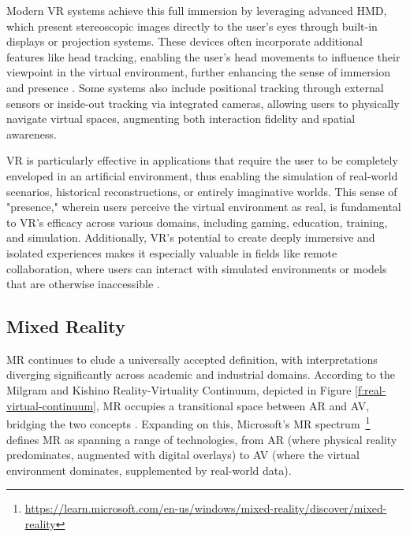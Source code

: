     Modern \ac{VR} systems achieve this full immersion by leveraging advanced \ac{HMD}, which present stereoscopic images directly to the user’s eyes through built-in displays or projection systems. These devices often incorporate additional features like head tracking, enabling the user’s head movements to influence their viewpoint in the virtual environment, further enhancing the sense of immersion and presence \cite{whatismixedreality}. Some systems also include positional tracking through external sensors or inside-out tracking via integrated cameras, allowing users to physically navigate virtual spaces, augmenting both interaction fidelity and spatial awareness.

    \ac{VR} is particularly effective in applications that require the user to be completely enveloped in an artificial environment, thus enabling the simulation of real-world scenarios, historical reconstructions, or entirely imaginative worlds. This sense of "presence," wherein users perceive the virtual environment as real, is fundamental to \ac{VR}'s efficacy across various domains, including gaming, education, training, and simulation. Additionally, \ac{VR}'s potential to create deeply immersive and isolated experiences makes it especially valuable in fields like remote collaboration, where users can interact with simulated environments or models that are otherwise inaccessible \cite{8712803}.


\subsection{Mixed Reality}
\label{subsection:digital-realities}
   
    \ac{MR} continues to elude a universally accepted definition, with interpretations diverging significantly across academic and industrial domains. According to the Milgram and Kishino Reality-Virtuality Continuum, depicted in Figure \ref{f:real-virtual-continuum}, \ac{MR} occupies a transitional space between \ac{AR} and \ac{AV}, bridging the two concepts \cite{milgram1994}. Expanding on this, Microsoft’s \ac{MR} spectrum~\footnote{\url{https://learn.microsoft.com/en-us/windows/mixed-reality/discover/mixed-reality}} defines \ac{MR} as spanning a range of technologies, from \ac{AR} (where physical reality predominates, augmented with digital overlays) to \ac{AV} (where the virtual environment dominates, supplemented by real-world data). 

